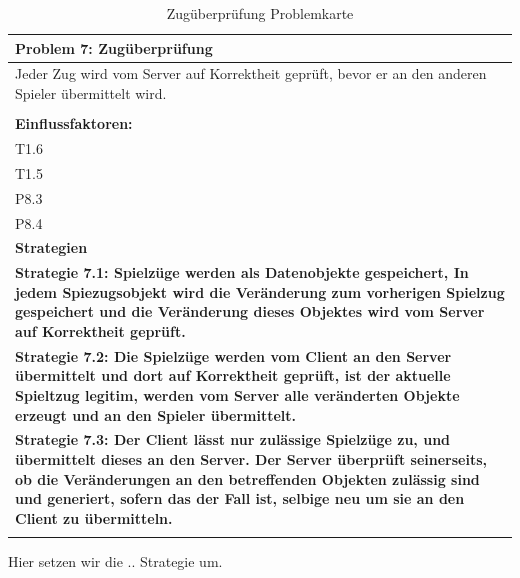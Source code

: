 \documentclass[fontsize=12pt,paper=a4,twoside]{scrartcl}
\begin{document}
\begin{table}[H]
    \centering
    \begin{tabular}{|p{15cm}|}
    \hline
          \textbf{Problem 7: Zugüberprüfung}  \\ \hline
	Jeder Zug wird vom Server auf Korrektheit geprüft, bevor er an den anderen Spieler übermittelt wird. \\
         \\ \hline
          \textbf{Einflussfaktoren: } \\
	T1.6 \\
	T1.5 \\
	P8.3 \\
	P8.4 \\
          \hline
          \textbf{Strategien} \\ \hline
            {}          
           \label{strategie:7.1}     
          \textbf{Strategie 7.1: Spielzüge werden als Datenobjekte gespeichert, In jedem Spiezugsobjekt wird die Veränderung zum vorherigen Spielzug gespeichert und die Veränderung dieses Objektes wird vom Server auf Korrektheit geprüft.}  \\        
  {}          
           \label{strategie:7.2}              
          \textbf{Strategie 7.2: Die Spielzüge werden vom Client an den Server übermittelt und dort auf Korrektheit geprüft, ist der aktuelle Spieltzug legitim, werden vom Server alle veränderten Objekte erzeugt und an den Spieler übermittelt.}  \\
	 {}          
           \label{strategie:7.3}     
          \textbf{Strategie 7.3: Der Client lässt nur zulässige Spielzüge zu, und übermittelt dieses an den Server. Der Server überprüft seinerseits, ob die Veränderungen an den betreffenden Objekten zulässig sind und generiert, sofern das der Fall ist, selbige neu um sie an den Client zu übermitteln.}  \\ 
	 \\ \hline
    \end{tabular}

    \caption{Zugüberprüfung Problemkarte}
    \label{tab:ProblemKarte7}
\end{table}
Hier setzen wir die .. Strategie um. \\
\end{document}
